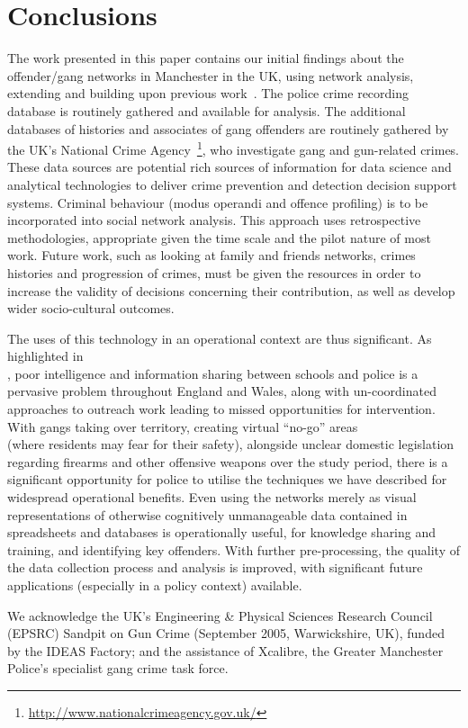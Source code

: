 \documentclass[twocolumn]{svjour3}          %
\theoremstyle{definition}
\begin{document}
\section{Conclusions}\label{sec:conclusion}

The work presented in this paper contains our initial findings about
the offender/gang networks in Manchester in the UK, using network
analysis, extending and building upon previous
work~\citep{oatley+crick_asonam2014,oatley+crick_fosintsi2014}. The
police crime recording database is routinely gathered and available
for analysis. The additional databases of histories and associates of
gang offenders are routinely gathered by the UK's National Crime
Agency~\footnote{\url{http://www.nationalcrimeagency.gov.uk/}}, who
investigate gang and gun-related crimes. These data sources are
potential rich sources of information for data science and analytical
technologies to deliver crime prevention and detection decision
support systems. Criminal behaviour (modus operandi and offence
profiling) is to be incorporated into social network analysis.  This
approach uses retrospective methodologies, appropriate given the time
scale and the pilot nature of most work. Future work, such as looking
at family and friends networks, crimes histories and progression of
crimes, must be given the resources in order to increase the validity
of decisions concerning their contribution, as well as develop wider
socio-cultural outcomes.

The uses of this technology in an operational context are thus
significant. As highlighted in\\ \citet{golding+mcclory:2008}, poor
intelligence and information sharing between schools and police is a
pervasive problem throughout England and Wales, along with
un-coordinated approaches to outreach work leading to missed
opportunities for intervention.  With gangs taking over territory,
creating virtual ``no-go'' areas\\(where residents may fear for their
safety), alongside unclear domestic legislation regarding firearms and
other offensive weapons over the study period, there is a significant
opportunity for police to utilise the techniques we have described for
widespread operational benefits. Even using the networks merely as
visual representations of otherwise cognitively unmanageable data
contained in spreadsheets and databases is operationally useful, for
knowledge sharing and training, and identifying key offenders. With
further pre-processing, the quality of the data collection process and
analysis is improved, with significant future applications (especially
in a policy context) available.

\begin{acknowledgements}
We acknowledge the UK's Engineering \& Physical Sciences Research
Council (EPSRC) Sandpit on Gun Crime (September 2005, Warwickshire,
UK), funded by the IDEAS Factory; and the assistance of Xcalibre, the Greater
Manchester Police's specialist gang crime task force.
\end{acknowledgements}

\end{document}
